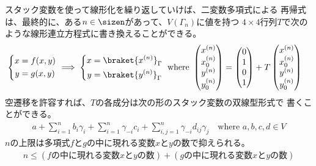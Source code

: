 {	スタック変数を使って線形化を繰り返していけば、二変数多項式による
	再帰式は、最終的に、ある$n\in\sizen$があって、$V(\Gamma_n)$に値を持つ
	$4\times4$行列$T$で次のような線形連立方程式に書き換えることができる。
	\begin{equation*}\begin{split}
		\left\{\begin{split}
			x &= f(x,y) \\
			y &= g(x,y) \\
		\end{split}\right. \implies 
		\left\{\begin{split}
			x &= \braket{x^{(n)}}_\Gamma \\
			y &= \braket{y^{(n)}}_\Gamma \\
		\end{split}\right. \text{ where } \begin{pmatrix}
				x^{(n)} \\ x_0^{(n)} \\ y^{(n)} \\ y_0^{(n)}
		\end{pmatrix} &= \begin{pmatrix}
			0 \\ 1 \\ 0 \\ 1 
		\end{pmatrix} + T \begin{pmatrix}
			x^{(n)} \\ x_0^{(n)} \\ y^{(n)} \\ y_0^{(n)}
		\end{pmatrix}
	\end{split}\end{equation*}
	空遷移を許容すれば、$T$の各成分は次の形のスタック変数の双線型形式で
	書くことができる。
	\begin{equation*}\begin{split}
		a + \sum_{i=1}^n b_i\gamma_i + \sum_{i=1}^n \gamma_{-i}c_i + 
		\sum_{i,j=1}^n \gamma_{-i}d_{ij}\gamma_j
		\quad\text{where } a,b,c,d\in V
	\end{split}\end{equation*}
	$n$の上限は多項式$f$と$g$の中に現れる変数$x$と$y$の数で抑えられる。
	\begin{equation*}\begin{split}
		n \le (\text{$f$の中に現れる変数$x$と$y$の数})
		+ (\text{$g$の中に現れる変数$x$と$y$の数})
	\end{split}\end{equation*}

}
